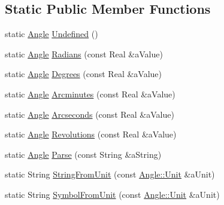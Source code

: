 \subsection*{Static Public Member Functions}
\begin{DoxyCompactItemize}
\item 
static \hyperlink{classlibrary_1_1physics_1_1units_1_1_angle}{Angle} \hyperlink{classlibrary_1_1physics_1_1units_1_1_angle_a9c9a16c58d7e1e95e38cf2adf888f334}{Undefined} ()
\item 
static \hyperlink{classlibrary_1_1physics_1_1units_1_1_angle}{Angle} \hyperlink{classlibrary_1_1physics_1_1units_1_1_angle_ac065fbde3c625159cf21153c23c3045b}{Radians} (const Real \&a\+Value)
\item 
static \hyperlink{classlibrary_1_1physics_1_1units_1_1_angle}{Angle} \hyperlink{classlibrary_1_1physics_1_1units_1_1_angle_a20b061534d7d24f807781a06b191603b}{Degrees} (const Real \&a\+Value)
\item 
static \hyperlink{classlibrary_1_1physics_1_1units_1_1_angle}{Angle} \hyperlink{classlibrary_1_1physics_1_1units_1_1_angle_a52f391389a2d59b327b5206e2ee24645}{Arcminutes} (const Real \&a\+Value)
\item 
static \hyperlink{classlibrary_1_1physics_1_1units_1_1_angle}{Angle} \hyperlink{classlibrary_1_1physics_1_1units_1_1_angle_a04df20ae83aa3609c7e7ac5eaf013db9}{Arcseconds} (const Real \&a\+Value)
\item 
static \hyperlink{classlibrary_1_1physics_1_1units_1_1_angle}{Angle} \hyperlink{classlibrary_1_1physics_1_1units_1_1_angle_a2e712e11187dec11a781d457a3f949dc}{Revolutions} (const Real \&a\+Value)
\item 
static \hyperlink{classlibrary_1_1physics_1_1units_1_1_angle}{Angle} \hyperlink{classlibrary_1_1physics_1_1units_1_1_angle_a3d7a56d496018330d9529036a31be312}{Parse} (const String \&a\+String)
\item 
static String \hyperlink{classlibrary_1_1physics_1_1units_1_1_angle_a95d8f1d9e27062ca480b7c264a035283}{String\+From\+Unit} (const \hyperlink{classlibrary_1_1physics_1_1units_1_1_angle_a3c329d415a61783b16ce481874cc5956}{Angle\+::\+Unit} \&a\+Unit)
\item 
static String \hyperlink{classlibrary_1_1physics_1_1units_1_1_angle_a2f51939276e1d1c2121e1fc911e6ca30}{Symbol\+From\+Unit} (const \hyperlink{classlibrary_1_1physics_1_1units_1_1_angle_a3c329d415a61783b16ce481874cc5956}{Angle\+::\+Unit} \&a\+Unit)
\end{DoxyCompactItemize}
